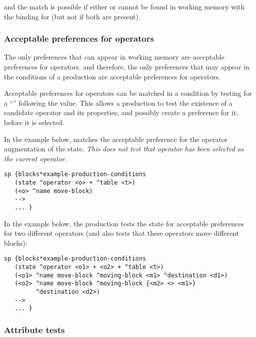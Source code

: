 and the match is possible if either  or  cannot be found in working memory with the binding for  (but not if both are present).

\subsubsection{Acceptable preferences for operators}
\label{SYNTAX-pm-lhs-acceptable}
\index{+}

The only preferences that can appear in working memory are acceptable preferences for operators, and therefore, the only preferences that may appear in the conditions of a production are acceptable preferences for operators.

Acceptable preferences for operators can be matched in a condition by testing for a ``\soar{+}'' following the value.  This allows a production to test the existence of a candidate operator and its properties, and possibly create a preference for it, before it is selected.

In the example below,  matches the acceptable preference for the operator augmentation of the state. \emph{This does not test that operator}  \emph{has been selected as the current operator}.

\begin{verbatim}
sp {blocks*example-production-conditions
   (state ^operator <o> + ^table <t>)
   (<o> ^name move-block)
   -->
   ... }
\end{verbatim}


In the example below, the production tests the state for acceptable preferences for two different operators (and also tests that these operators move different blocks):

\begin{verbatim}
sp {blocks*example-production-conditions
   (state ^operator <o1> + <o2> + ^table <t>)
   (<o1> ^name move-block ^moving-block <m1> ^destination <d1>)
   (<o2> ^name move-block ^moving-block {<m2> <> <m1>}
         ^destination <d2>)
   -->
   ... }
\end{verbatim}

\subsubsection{Attribute tests}
\label{SYNTAX-pm-lhs-attributes}

